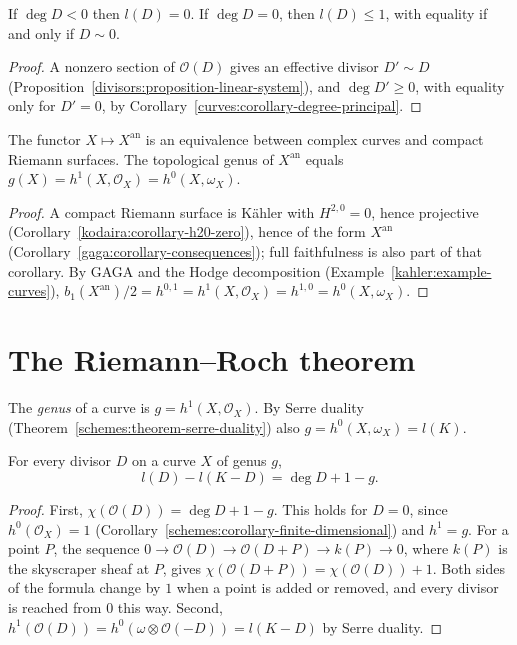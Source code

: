 \begin{lemma}\label{curves:lemma-negative-degree}
If $\deg D < 0$ then $l(D) = 0$. If $\deg D = 0$, then $l(D) \leq 1$, with equality if and only if $D \sim 0$.
\end{lemma}

\begin{proof}
A nonzero section of $\mathcal{O}(D)$ gives an effective divisor $D' \sim D$ (Proposition~\ref{divisors:proposition-linear-system}), and $\deg D' \geq 0$, with equality only
for $D' = 0$, by Corollary~\ref{curves:corollary-degree-principal}.
\end{proof}

\begin{theorem}\label{curves:theorem-riemann-surfaces}
The functor $X \mapsto X^{\mathrm{an}}$ is an equivalence between complex curves and compact Riemann surfaces. The topological genus of $X^{\mathrm{an}}$ equals
$g(X) = h^1(X, \mathcal{O}_X) = h^0(X, \omega_X)$.
\end{theorem}

\begin{proof}
A compact Riemann surface is K\"ahler with $H^{2,0} = 0$, hence projective (Corollary~\ref{kodaira:corollary-h20-zero}), hence of the form $X^{\mathrm{an}}$
(Corollary~\ref{gaga:corollary-consequences}); full faithfulness is also part of that corollary. By GAGA and the Hodge decomposition
(Example~\ref{kahler:example-curves}), $b_1(X^{\mathrm{an}})/2 = h^{0,1} = h^1(X, \mathcal{O}_X) = h^{1,0} = h^0(X, \omega_X)$.
\end{proof}

\section{The Riemann--Roch theorem}\label{curves:section-riemann-roch}

\begin{definition}\label{curves:definition-genus}
The \emph{genus} of a curve is $g = h^1(X, \mathcal{O}_X)$. By Serre duality (Theorem~\ref{schemes:theorem-serre-duality}) also $g = h^0(X, \omega_X) = l(K)$.
\end{definition}

\begin{theorem}\label{curves:theorem-riemann-roch}
For every divisor $D$ on a curve $X$ of genus $g$,
\[
l(D) - l(K - D) = \deg D + 1 - g .
\]
\end{theorem}

\begin{proof}
First, $\chi(\mathcal{O}(D)) = \deg D + 1 - g$. This holds for $D = 0$, since $h^0(\mathcal{O}_X) = 1$ (Corollary~\ref{schemes:corollary-finite-dimensional}) and
$h^1 = g$. For a point $P$, the sequence $0 \to \mathcal{O}(D) \to \mathcal{O}(D + P) \to k(P) \to 0$, where $k(P)$ is the skyscraper sheaf at $P$, gives
$\chi(\mathcal{O}(D + P)) = \chi(\mathcal{O}(D)) + 1$. Both sides of the formula change by $1$ when a point is added or removed, and every divisor is reached from $0$ this way. Second,
$h^1(\mathcal{O}(D)) = h^0(\omega \otimes \mathcal{O}(-D)) = l(K - D)$ by Serre duality.
\end{proof}

